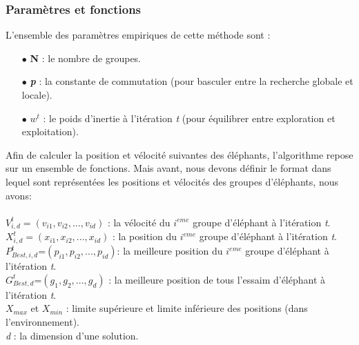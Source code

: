 \subsubsection{Paramètres et fonctions \cite{EHO1}}
L'ensemble des paramètres empiriques de cette méthode sont : 
\begin{itemize}
	\item[$\bullet$] \textbf{N} : le nombre de groupes.
	\item[$\bullet$] \textbf{\textit{p}} : la constante de commutation (pour basculer entre la recherche globale et locale).
	\item[$\bullet$] \textbf{$w^{t} $} : le poids d'inertie à l'itération \textit{t} (pour équilibrer entre exploration et exploitation).\\
\end{itemize}

\noindent
Afin de calculer la position et vélocité suivantes des éléphants, l'algorithme repose sur un ensemble de fonctions. Mais avant, nous devons définir le format dans lequel sont représentées les positions et vélocités des groupes d'éléphants, nous avons:\\
\textbf{ }\\
$V^{t}_{i,d} = (v_{i1} , v_{i2} , ..., v_{id} )$ : la vélocité du $i^{eme}$ groupe d'éléphant à l'itération \textit{t}.\\
$X^{t}_{i,d} = (x_{i1} , x_{i2} , ..., x_{id} )$ : la position du $i^{eme}$ groupe d'éléphant à l'itération \textit{t}.\\
$P^{t}_{Best,i,d}$=$(p_{i1}, p_{i2}, ...,p_{id} )$: la meilleure position du $i^{eme}$ groupe d'éléphant à l'itération \textit{t}. \\
$G^{t}_{Best,d}$=$(g_{1} , g_{2} , ..., g_{d} )$ : la meilleure position de tous l'essaim d'éléphant à l'itération \textit{t}.\\
$X_{max}$ et $X_{min}$ : limite supérieure et limite inférieure des positions (dans l'environnement).\\
\textit{d} :  la dimension d'une solution.\\ 


